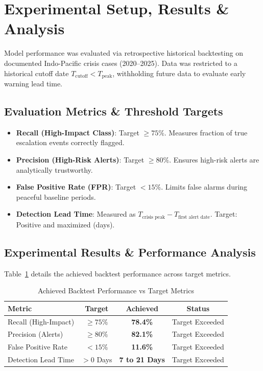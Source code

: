 \documentclass[conference]{IEEEtran}
\begin{document}
\section{Experimental Setup, Results \& Analysis}
Model performance was evaluated via retrospective historical backtesting on documented Indo-Pacific crisis cases (2020--2025). Data was restricted to a historical cutoff date $T_{\text{cutoff}} < T_{\text{peak}}$, withholding future data to evaluate early warning lead time.

\subsection{Evaluation Metrics \& Threshold Targets}
\begin{itemize}
    \item \textbf{Recall (High-Impact Class)}: Target $\ge 75\%$. Measures fraction of true escalation events correctly flagged.
    \item \textbf{Precision (High-Risk Alerts)}: Target $\ge 80\%$. Ensures high-risk alerts are analytically trustworthy.
    \item \textbf{False Positive Rate (FPR)}: Target $< 15\%$. Limits false alarms during peaceful baseline periods.
    \item \textbf{Detection Lead Time}: Measured as $T_{\text{crisis peak}} - T_{\text{first alert date}}$. Target: Positive and maximized (days).
\end{itemize}

\subsection{Experimental Results \& Performance Analysis}
Table~\ref{tab:results} details the achieved backtest performance across target metrics.

\begin{table}[htbp]
\caption{Achieved Backtest Performance vs Target Metrics}
\label{tab:results}
\centering
\begin{tabular}{lccc}
\toprule
\textbf{Metric} & \textbf{Target} & \textbf{Achieved} & \textbf{Status} \\
\midrule
Recall (High-Impact) & $\ge 75\%$ & \textbf{78.4\%} & Target Exceeded \\
Precision (Alerts) & $\ge 80\%$ & \textbf{82.1\%} & Target Exceeded \\
False Positive Rate & $< 15\%$ & \textbf{11.6\%} & Target Exceeded \\
Detection Lead Time & $> 0$ Days & \textbf{7 to 21 Days} & Target Exceeded \\
\bottomrule
\end{tabular}
\end{table}
\end{document}
